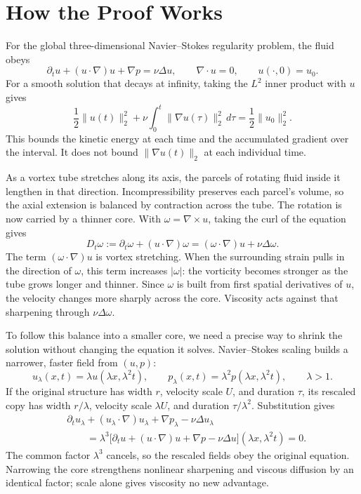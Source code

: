 \section*{How the Proof Works}

For the global three-dimensional Navier--Stokes regularity problem, the fluid
obeys
\[
\partial_tu+(u\!\cdot\nabla)u+\nabla p=\nu\Delta u,
\qquad
\nabla\!\cdot u=0,
\qquad
u(\cdot,0)=u_0.
\]
For a smooth solution that decays at infinity, taking the \(L^2\) inner product
with \(u\) gives
\[
\frac12\|u(t)\|_2^2
+\nu\int_0^t\|\nabla u(\tau)\|_2^2\,d\tau
=\frac12\|u_0\|_2^2.
\]
This bounds the kinetic energy at each time and the accumulated gradient over
the interval. It does not bound \(\|\nabla u(t)\|_2\) at each individual time.

As a vortex tube stretches along its axis, the parcels of rotating fluid
inside it lengthen in that direction. Incompressibility preserves each
parcel's volume, so the axial extension is balanced by contraction across the
tube. The rotation is now carried by a thinner core. With
\(\omega=\nabla\times u\), taking the curl of the equation gives
\[
D_t\omega
:=\partial_t\omega+(u\!\cdot\nabla)\omega
=(\omega\!\cdot\nabla)u+\nu\Delta\omega.
\]
The term \((\omega\!\cdot\nabla)u\) is vortex stretching. When the surrounding
strain pulls in the direction of \(\omega\), this term increases
\(|\omega|\): the vorticity becomes stronger as the tube grows longer and
thinner. Since \(\omega\) is built from first spatial derivatives of \(u\),
the velocity changes more sharply across the core. Viscosity acts against that
sharpening through \(\nu\Delta\omega\).

To follow this balance into a smaller core, we need a precise way to shrink the
solution without changing the equation it solves. Navier--Stokes scaling builds
a narrower, faster field from \((u,p)\):
\[
u_\lambda(x,t)=\lambda u(\lambda x,\lambda^2t),
\qquad
p_\lambda(x,t)=\lambda^2p(\lambda x,\lambda^2t),
\qquad
\lambda>1.
\]
If the original structure has width \(r\), velocity scale \(U\), and duration
\(\tau\), its rescaled copy has width \(r/\lambda\), velocity scale
\(\lambda U\), and duration \(\tau/\lambda^2\). Substitution gives
\[
\begin{aligned}
&\partial_tu_\lambda
+(u_\lambda\!\cdot\nabla)u_\lambda
+\nabla p_\lambda-\nu\Delta u_\lambda\\
&\qquad
=\lambda^3
\bigl[\partial_tu+(u\!\cdot\nabla)u+\nabla p-\nu\Delta u\bigr]
(\lambda x,\lambda^2t)
=0.
\end{aligned}
\]
The common factor \(\lambda^3\) cancels, so the rescaled fields obey the
original equation. Narrowing the core strengthens nonlinear sharpening and
viscous diffusion by an identical factor; scale alone gives viscosity no new
advantage.

